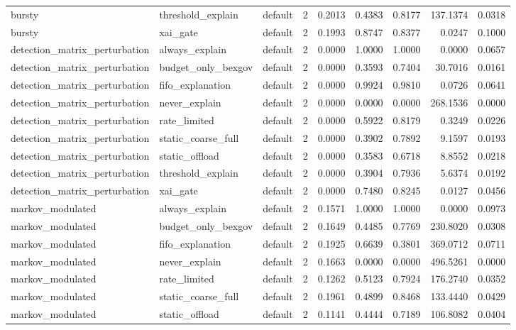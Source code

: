 \begin{table}[t]
\begin{tabular}{lllrrrrrr}
bursty & threshold\_explain & default & 2 & 0.2013 & 0.4383 & 0.8177 & 137.1374 & 0.0318 \\
bursty & xai\_gate & default & 2 & 0.1993 & 0.8747 & 0.8377 & 0.0247 & 0.1000 \\
detection\_matrix\_perturbation & always\_explain & default & 2 & 0.0000 & 1.0000 & 1.0000 & 0.0000 & 0.0657 \\
detection\_matrix\_perturbation & budget\_only\_bexgov & default & 2 & 0.0000 & 0.3593 & 0.7404 & 30.7016 & 0.0161 \\
detection\_matrix\_perturbation & fifo\_explanation & default & 2 & 0.0000 & 0.9924 & 0.9810 & 0.0726 & 0.0641 \\
detection\_matrix\_perturbation & never\_explain & default & 2 & 0.0000 & 0.0000 & 0.0000 & 268.1536 & 0.0000 \\
detection\_matrix\_perturbation & rate\_limited & default & 2 & 0.0000 & 0.5922 & 0.8179 & 0.3249 & 0.0226 \\
detection\_matrix\_perturbation & static\_coarse\_full & default & 2 & 0.0000 & 0.3902 & 0.7892 & 9.1597 & 0.0193 \\
detection\_matrix\_perturbation & static\_offload & default & 2 & 0.0000 & 0.3583 & 0.6718 & 8.8552 & 0.0218 \\
detection\_matrix\_perturbation & threshold\_explain & default & 2 & 0.0000 & 0.3904 & 0.7936 & 5.6374 & 0.0192 \\
detection\_matrix\_perturbation & xai\_gate & default & 2 & 0.0000 & 0.7480 & 0.8245 & 0.0127 & 0.0456 \\
markov\_modulated & always\_explain & default & 2 & 0.1571 & 1.0000 & 1.0000 & 0.0000 & 0.0973 \\
markov\_modulated & budget\_only\_bexgov & default & 2 & 0.1649 & 0.4485 & 0.7769 & 230.8020 & 0.0308 \\
markov\_modulated & fifo\_explanation & default & 2 & 0.1925 & 0.6639 & 0.3801 & 369.0712 & 0.0711 \\
markov\_modulated & never\_explain & default & 2 & 0.1663 & 0.0000 & 0.0000 & 496.5261 & 0.0000 \\
markov\_modulated & rate\_limited & default & 2 & 0.1262 & 0.5123 & 0.7924 & 176.2740 & 0.0352 \\
markov\_modulated & static\_coarse\_full & default & 2 & 0.1961 & 0.4899 & 0.8468 & 133.4440 & 0.0429 \\
markov\_modulated & static\_offload & default & 2 & 0.1141 & 0.4444 & 0.7189 & 106.8082 & 0.0404 \\

\end{tabular}
\end{table}
